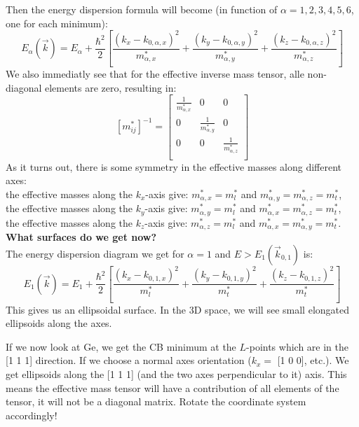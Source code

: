 {\begin{center}
	\end{center}
	Then the energy dispersion formula will become (in function of $\alpha = 1, 2, 3, 4, 5, 6$, one for each minimum):
	\begin{equation}
		E_{\alpha}(\vec{k}) = E_{\alpha} + \frac{\hbar^2}{2}\left[\frac{(k_x - k_{0, \alpha, x})^2}{m^*_{\alpha, x}} + \frac{(k_y - k_{0, \alpha, y})^2}{m^*_{\alpha, y}} + \frac{(k_z - k_{0, \alpha, z})^2}{m^*_{\alpha, z}}\right]
	\end{equation}
	We also immediatly see that for the effective inverse mass tensor, alle non-diagonal elements are zero, resulting in:
	\begin{equation}
		\left[m^*_{ij}\right]^{-1} = \left[
		\begin{array}{ccc}
			\frac{1}{m^*_{\alpha, x}} & 0 & 0 \\
			0 & \frac{1}{m^*_{\alpha, y}} & 0 \\
			0 & 0 & \frac{1}{m^*_{\alpha, z}}\\
		\end{array}
		\right]
	\end{equation}
	As it turns out, there is some symmetry in the effective masses along different axes:\\
	\quad the effective masses along the $k_x$-axis give: $m^*_{\alpha, x} = m^*_l$ and $m^*_{\alpha, y} = m^*_{\alpha, z} = m^*_t$, \\
	\quad the effective masses along the $k_y$-axis give: $m^*_{\alpha, y} = m^*_l$ and $m^*_{\alpha, x} = m^*_{\alpha, z} = m^*_t$, \\
	\quad the effective masses along the $k_z$-axis give: $m^*_{\alpha, z} = m^*_l$ and $m^*_{\alpha, x} = m^*_{\alpha, y} = m^*_t$. \\ \newline
	\textbf{What surfaces do we get now?} \\
	The energy dispersion diagram we get for $\alpha = 1$ and $E > E_1(\vec{k}_{0, 1})$ is:
	\begin{equation}
		E_{1}(\vec{k}) = E_{1} + \frac{\hbar^2}{2}\left[\frac{(k_x - k_{0, 1, x})^2}{m^*_l} + \frac{(k_y - k_{0, 1, y})^2}{m^*_t} + \frac{(k_z - k_{0, 1, z})^2}{m^*_t}\right]
	\end{equation}
	This gives us an ellipsoidal surface. In the 3D space, we will see small elongated ellipsoids along the axes.
}
 {
	If we now look at Ge, we get the CB minimum at the $L$-points which are in the [1 1 1] direction. If we choose a normal axes orientation ($k_x = $ [1 0 0], etc.). We get ellipsoids along the [1 1 1] (and the two axes perpendicular to it) axis. This means the effective mass tensor will have a contribution of all elements of the tensor, it will not be a diagonal matrix. Rotate the coordinate system accordingly!
}

